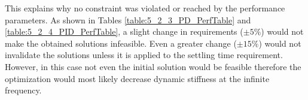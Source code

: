 This explains why no constraint was violated or reached by the performance parameters. As shown in Tables \ref{table:5_2_3_PD_PerfTable} and \ref{table:5_2_4_PID_PerfTable}, a slight change in requirements ($\pm5\%$) would not make the obtained solutions infeasible. Even a greater change ($\pm15\%$) would not invalidate the solutions unless it is applied to the settling time requirement. However, in this case not even the initial solution would be feasible therefore the optimization would most likely decrease dynamic stiffness at the infinite frequency.
%
%
%
%
%
%
%
%
